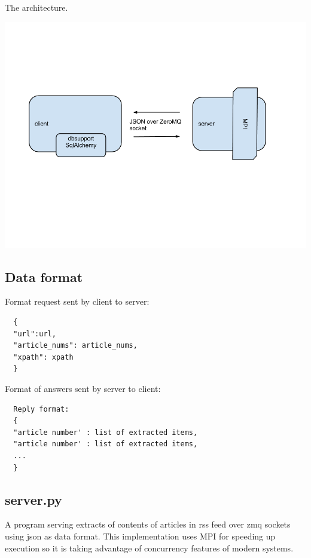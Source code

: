\documentclass[a4paper,12pt]{article}
\begin{document}
The architecture.
\begin{center}
 \includegraphics[width=\textwidth,height=\textheight,keepaspectratio]{prirdiagram.png}
\end{center}

\subsection{Data format}

  Format request sent by client to server:
  \begin{verbatim}
  {
  "url":url,
  "article_nums": article_nums,
  "xpath": xpath
  }
  \end{verbatim}
  
  Format of answers sent by server to client:

  \begin{verbatim}
  Reply format:
  {
  "article number' : list of extracted items,
  "article number' : list of extracted items,
  ...
  }
  \end{verbatim}
  
\subsection{server.py}

A program serving extracts of contents of articles in rss feed over zmq
sockets using json as data format.  This implementation uses MPI for
speeding up execution so it is taking advantage of concurrency features
of modern systems.
\end{document}
